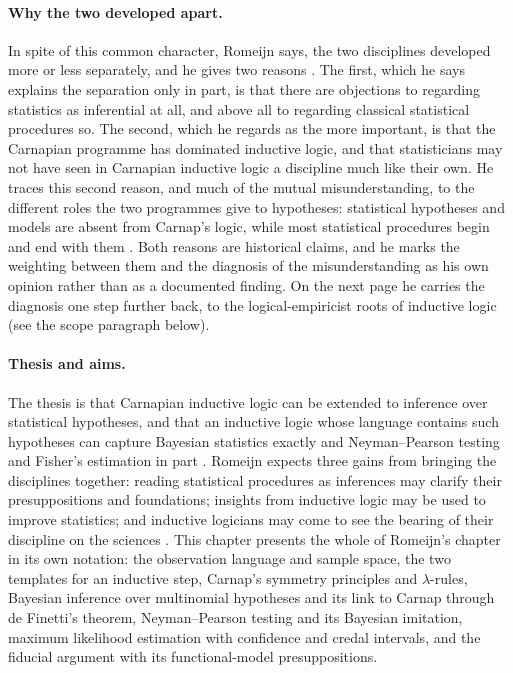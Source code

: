 \paragraph{Why the two developed apart.}
In spite of this common character, Romeijn says, the two disciplines
developed more or less separately, and he gives two reasons
\cite[p.~625]{Romeijn2011InductiveLogicStatistics}. The first, which he
says explains the separation only in part, is that there are objections
to regarding statistics as inferential at all, and above all to
regarding classical statistical procedures so. The second, which he
regards as the more important, is that the Carnapian programme has
dominated inductive logic, and that statisticians may not have seen in
Carnapian inductive logic a discipline much like their own. He traces
this second reason, and much of the mutual misunderstanding, to the
different roles the two programmes give to hypotheses: statistical
hypotheses and models are absent from Carnap's logic, while most
statistical procedures begin and end with them
\cite[p.~625]{Romeijn2011InductiveLogicStatistics}. Both reasons are
historical claims, and he marks the weighting between them and the
diagnosis of the misunderstanding as his own opinion rather than as a
documented finding. On the next page he carries the diagnosis one step
further back, to the logical-empiricist roots of inductive logic (see
the scope paragraph below).

\paragraph{Thesis and aims.}
The thesis is that Carnapian inductive logic can be extended to
inference over statistical hypotheses, and that an inductive logic
whose language contains such hypotheses can capture Bayesian
statistics exactly and Neyman--Pearson testing and Fisher's estimation
in part \cite[pp.~625--626]{Romeijn2011InductiveLogicStatistics}.
Romeijn expects three gains from bringing the disciplines together:
reading statistical procedures as inferences may clarify their
presuppositions and foundations; insights from inductive logic may be
used to improve statistics; and inductive logicians may come to see the
bearing of their discipline on the sciences
\cite[p.~625]{Romeijn2011InductiveLogicStatistics}.
This chapter presents the whole of Romeijn's chapter in its own
notation: the observation language and sample space, the two templates
for an inductive step, Carnap's symmetry principles and
\(\lambda\)-rules, Bayesian inference over multinomial hypotheses and
its link to Carnap through de Finetti's theorem, Neyman--Pearson
testing and its Bayesian imitation, maximum likelihood estimation with
confidence and credal intervals, and the fiducial argument with its
functional-model presuppositions.

